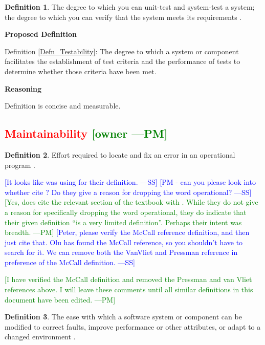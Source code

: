\documentclass[letterpaper, cleveref]{lipics-v2019}
\newcommand{\authornote}[3]{\textcolor{#1}{[#3 ---#2]}}
\newcommand{\authornote}[3]{}
\newcommand{\wss}[1]{\authornote{blue}{SS}{#1}} %
\newcommand{\pmi}[1]{\authornote{green}{PM}{#1}} %
\newcommand{\notdone}[1]{\textcolor{red}{#1}}
\theoremstyle{definition}
\newtheorem{defn}{Definition}
\begin{document}
\begin{defn}
	The degree to which you can unit-test and system-test a system; the degree
  to which you can verify that the system meets its requirements
  \citep{mcconnell2004code}.
\end{defn}

\noindent \textbf{Proposed Definition}

Definition \ref{Defn_Testability}: The degree to which a system or component
 facilitates the establishment of test criteria and the performance of tests
 to determine whether those criteria have been met.

\noindent \textbf{Reasoning}

Definition is concise and measurable.


\subsection{\notdone{Maintainability} \pmi{owner}}

\begin{defn}
  Effort required to locate and fix an error in an operational program
  \citep{McCallEtAl1977}.

  \wss{It looks like \citet{pressman2005software} was using
  \citet{McCallEtAl1977} for their definition.} \wss{PM - can you please
  look into whether \citet{pressman2005software} cite
  \citet{McCallEtAl1977}?  Do they give a reason for dropping the word
  operational?}  \pmi{Yes, \citet{pressman2005software} does cite the
  relevant section of the textbook with \citet{McCallEtAl1977}. While they
  do not give a reason for specifically dropping the word operational, they
  do indicate that their given definition ``is a very limited definition''.
  Perhaps their intent was breadth.} \wss{Peter, please verify the McCall
  reference definition, and then just cite that.  Olu has found the McCall
  reference, so you shouldn't have to search for it.  We can remove both the
  VanVliet and Pressman reference in preference of the McCall definition.}

  \pmi{I have verified the McCall definition and removed the Pressman and
  van Vliet references above. I will leave these comments until all similar
  definitions in this document have been edited.}
\end{defn}

\begin{defn} \label{MaintainabilityDefnSelected1} 
  The ease with which a software system or component can be modified to correct
  faults, improve performance or other attributes, or adapt to a changed
  environment \citep{IEEEStdGlossarySET1990}.
\end{defn}
\end{document}
